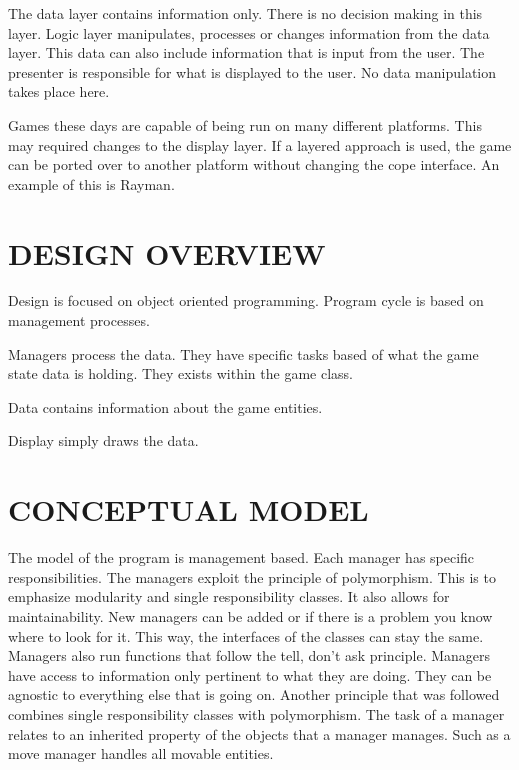 \documentclass[10pt,twocolumn]{witseiepaper}
\begin{document}
The data layer contains information only. There is no decision making in this layer. Logic layer manipulates, processes or changes information from the data layer. This data can also include information that is input from the user. The presenter is responsible for what is displayed to the user. No data manipulation takes place here.

Games these days are capable of being run on many different platforms. This may required changes to the display layer. If a layered approach is used, the game can be ported over to another platform without changing the cope interface. An example of this is Rayman. 

%
\section{DESIGN OVERVIEW}
Design is focused on object oriented programming. Program cycle is based on management processes.

Managers process the data. They have specific tasks based of what the game state data is holding. They exists within the game class. 

Data contains information about the game entities. 

Display simply draws the data.



%
\section{CONCEPTUAL MODEL}
The model of the program is management based. Each manager has specific responsibilities. The managers exploit the principle of polymorphism. This is to emphasize modularity and single responsibility classes. It also allows for maintainability. New managers can be added or if there is a problem you know where to look for it. This way, the interfaces of the classes can stay the same. Managers also run functions that follow the tell, don't ask principle. Managers have access to information only pertinent to what they are doing. They can be agnostic to everything else that is going on. Another principle that was followed combines single responsibility classes with polymorphism. The task of a manager relates to an inherited property of the objects that a manager manages. Such as a move manager handles all movable entities.
\end{document}

